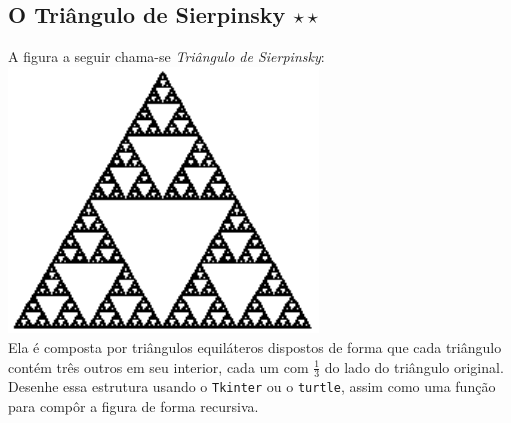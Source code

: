 \documentclass[12pt]{article}
\newcommand{\mono}[1]{\texttt{#1}}
\begin{document}
	\subsection{O Triângulo de Sierpinsky $\star\star$}
	A figura a seguir chama-se \emph{Triângulo de Sierpinsky}:
	\\
	\includegraphics[height=200pt]{sierpinsky.png}
	\\
	Ela é composta por triângulos equiláteros dispostos de forma que cada triângulo contém três outros em seu interior, cada um com $\frac{1}{3}$ do lado do triângulo original.
	Desenhe essa estrutura usando o \mono{Tkinter} ou o \mono{turtle}, assim como uma função para compôr a figura de forma recursiva.
\end{document}
